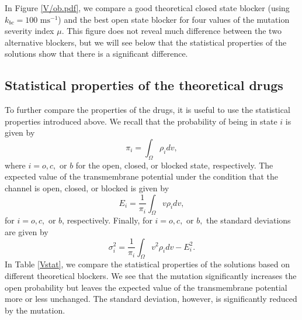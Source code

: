 
In Figure \ref{V/ob.pdf}, we compare a good theoretical closed state blocker (using $k_{bc}=100\text{ ms}^{-1}$) and the best
open state blocker for four values of the mutation severity index $\mu$. This figure does not reveal
much difference between the two alternative blockers, but we will see below that
the statistical properties
of the solutions show that there is a significant difference.



\bigskip

\subsection{Statistical properties of the theoretical drugs}

To further compare the properties of the drugs, it is useful
to use the statistical properties introduced above. We recall that the
probability of being in state $i$ is given by%
\[
\pi_{i}=\int_{\Omega}\rho_{i}dv,
\]
where $i=o,c,$ or $b$ for the open, closed, or blocked state, respectively. The expected value of the transmembrane
potential under the condition that the channel is open, closed, or blocked is
given by
\[
E_{i}=\frac{1}{\pi_{i}}\int_{\Omega}v\rho_{i}dv,
\]
for $i=o,c,$ or $b$, respectively. Finally, for $i=o,c,$ or $b,$ the standard
deviations are given by%
\[
\sigma_{i}^{2}=\frac{1}{\pi_{i}}\int_{\Omega}v^{2}\rho_{i}dv-E_{i}^{2}.
\]
In Table \ref{Vstat}, we compare the statistical properties of the solutions based on
different theoretical blockers. We see that the mutation significantly increases the open probability but leaves the expected value of the transmembrane potential more or less unchanged. The standard deviation, however, is significantly reduced by the mutation.

